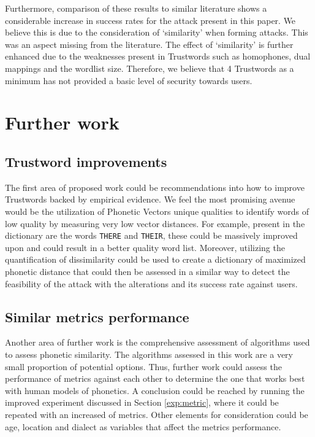 Furthermore, comparison of these results to similar literature shows a considerable increase in success rates for the attack present in this paper. We believe this is due to the consideration of `similarity' when forming attacks. This was an aspect missing from the literature.
The effect of `similarity' is further enhanced due to the  weaknesses present in Trustwords such as homophones, dual mappings and the wordlist size. Therefore, we believe that 4 Trustwords as a minimum has not provided a basic level of security towards users.

\section{Further work}

\subsection*{Trustword improvements}
The first area of proposed work could be recommendations into how to improve Trustwords backed by empirical evidence. We feel the most promising avenue would be the utilization of Phonetic Vectors unique qualities to identify words of low quality by measuring very low vector distances. For example, present in the dictionary are the words \verb|THERE| and \verb|THEIR|, these could be massively improved upon and could result in a better quality word list. Moreover, utilizing the quantification of dissimilarity could be used to create a dictionary of maximized phonetic distance that could then be assessed in a similar way to detect the feasibility of the attack with the alterations and its success rate against users.

\subsection*{Similar metrics performance}
Another area of further work is the comprehensive assessment of algorithms used to assess phonetic similarity. The algorithms assessed in this work are a very small proportion of potential options. Thus, further work could assess the performance of metrics against each other to determine the one that works best with human models of phonetics. A conclusion could be reached by running the improved experiment discussed in Section \ref{exp:metric}, where it could be repeated with an increased of metrics. Other elements for consideration could be age, location and dialect as variables that affect the metrics performance. 

